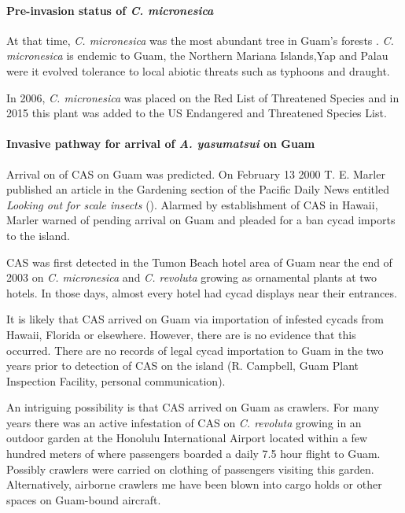 \documentclass[12pt,letterpaper,english,bibliography=totocnumbered, abstract=on]{scrartcl}
\begin{document}
\paragraph{Pre-invasion status of \textit{C. micronesica}}

At that time, \textit{C. micronesica} was the most abundant tree in Guam's forests \cite{donnegon_guams_2004}. \textit{C. micronesica} is endemic to Guam, the Northern Mariana Islands,Yap and Palau were it evolved tolerance to local abiotic threats such as typhoons and draught. 

In 2006, \textit{C. micronesica} was placed on the Red List of Threatened Species and in 2015 this plant was added to the US Endangered and Threatened Species List.

\paragraph{Invasive pathway for arrival of \textit{A. yasumatsui} on Guam} 

Arrival on of CAS on Guam was predicted. On February 13 2000 T. E. Marler published an article in the Gardening section of the Pacific Daily News entitled \textit{Looking out for scale insects} (\cite{haynesExoticInvasivePest2005}). Alarmed by establishment of CAS in Hawaii, Marler warned of pending arrival on Guam and pleaded for a ban cycad imports to the island. 

CAS was first detected in the Tumon Beach hotel area of Guam near the end of 2003 on \textit{C. micronesica} and \textit{C. revoluta} growing as ornamental plants at two hotels. In those days, almost every hotel had cycad displays near their entrances.

It is likely that CAS arrived on Guam via importation of infested cycads from Hawaii, Florida or elsewhere. However, there are is no evidence that this occurred. There are no records of legal cycad importation to Guam in the two years prior to detection of CAS on the island (R. Campbell, Guam Plant Inspection Facility, personal communication).  

An intriguing possibility is that CAS arrived on Guam as crawlers. For many years there was an active infestation of CAS on \textit{C. revoluta} growing in an outdoor garden at the Honolulu International Airport located within a few hundred meters of where passengers boarded a daily 7.5 hour flight to Guam. Possibly crawlers were carried on clothing of passengers visiting this garden. Alternatively, airborne crawlers me have been blown into cargo holds or other spaces on Guam-bound aircraft.
\end{document}
